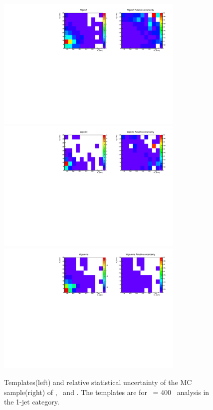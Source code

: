 \begin{figure}[htp]
\centering
\includegraphics[width=0.8\textwidth]{figures/2dtemplate_WjetsE_mH400_1j.pdf}
\includegraphics[width=0.8\textwidth]{figures/2dtemplate_WjetsM_mH400_1j.pdf}
\includegraphics[width=0.8\textwidth]{figures/2dtemplate_Wgamma_mH400_1j.pdf}
\caption{Templates(left) and relative statistical uncertainty of the MC sample(right) 
of \WjetsE, \WjetsM\ and \wgamma. 
The templates are for \mHi\ = 400 \GeV\ analysis in the 1-jet category.}
\label{fig:2dtemplate_400_1j_3}
\end{figure}

